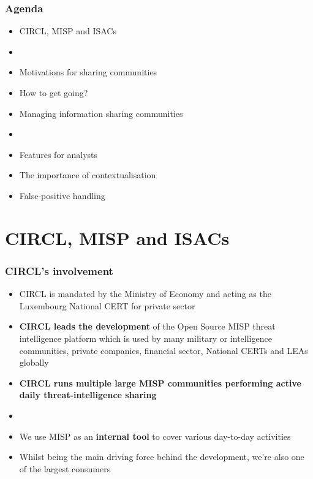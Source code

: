 
\begin{frame}[t,plain]
\titlepage
\end{frame}

\begin{frame}
	\frametitle{Agenda}
	\begin{itemize}
		\item CIRCL, MISP and ISACs
		\item []
		\item Motivations for sharing communities
		\item How to get going?
		\item Managing information sharing communities
		\item []
		\item Features for analysts
		\item The importance of contextualisation
		\item False-positive handling
	\end{itemize}
\end{frame}

\section{CIRCL, MISP and ISACs}

\begin{frame}
	\frametitle{CIRCL's involvement}
	\begin{itemize}
		\item CIRCL is mandated by the Ministry of Economy and acting as the Luxembourg National CERT for private sector
		\item \textbf{CIRCL leads the development} of the Open Source MISP threat intelligence platform which is used by many military or intelligence communities, private companies, financial sector, National CERTs and LEAs globally
		\item \textbf{CIRCL runs multiple large MISP communities performing active daily threat-intelligence sharing}
        \item []
        \item We use MISP as an \textbf{internal tool} to cover various day-to-day activities
        \item Whilst being the main driving force behind the development, we're also one of the largest consumers
	\end{itemize}
\end{frame}


